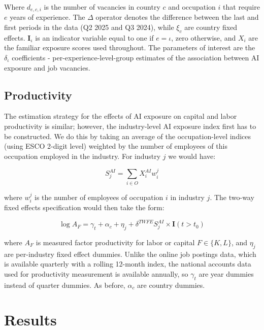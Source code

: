 \documentclass[11pt]{article}
\begin{document}
Where $d_{e,c,i}$ is the number of vacancies in country $c$ and occupation $i$ that require $e$ years of experience. The $\Delta$ operator denotes the difference between the last and first periods in the data (Q2 2025 and Q3 2024), while $\xi_c$ are country fixed effects. $\mathbf{I}_{\iota}$ is an indicator variable equal to one if $e = \iota$, zero otherwise, and $X_i$ are the familiar exposure scores used throughout. The parameters of interest are the $\delta_{\iota}$ coefficients - per-experience-level-group estimates of the association between AI exposure and job vacancies.

\subsection{Productivity}

The estimation strategy for the effects of AI exposure on capital and labor productivity is similar; however, the industry-level AI exposure index first has to be constructed. We do this by taking an average of the occupation-level indices (using ESCO 2-digit level) weighted by the number of employees of this occupation employed in the industry. For industry $j$ we would have:

\begin{equation}
S_j^{AI}=\sum_{i \in O} X^{AI}_i w^j_i
\label{eq:industry}
\end{equation}

where $w^j_i$ is the number of employees of occupation $i$ in industry $j$. The two-way fixed effects specification would then take the form:

\begin{equation}
\log{A_F} = \gamma_t + \alpha_c + \eta_j + \delta^{TWFE} S_j^{AI} \times \mathbf{I}(t>t_0)
\label{eq:productivity}
\end{equation}

where $A_F$ is measured factor productivity for labor or capital $F \in \{K,L\}$, and $\eta_j$ are per-industry fixed effect dummies. Unlike the online job postings data, which is available quarterly with a rolling 12-month index, the national accounts data used for productivity measurement is available annually, so $\gamma_t$ are year dummies instead of quarter dummies. As before, $\alpha_c$ are country dummies.


\section{Results}
\label{sec:results}
\end{document}

